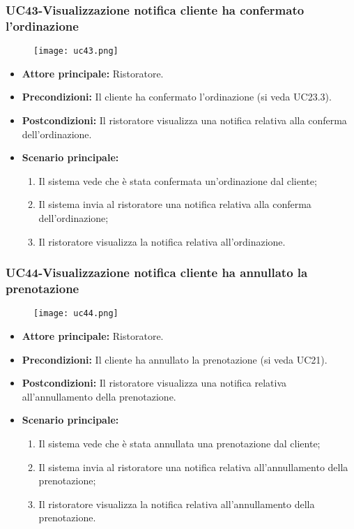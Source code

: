 \subsubsection{UC43-Visualizzazione notifica cliente ha confermato l'ordinazione}
\begin{figure}[h] \texttt{[image: uc43.png]} \end{figure}
\begin{itemize}
\item \textbf{Attore principale:} Ristoratore.
\item \textbf{Precondizioni:} Il cliente ha confermato l'ordinazione (si veda UC23.3).
\item \textbf{Postcondizioni:} Il ristoratore visualizza una notifica relativa alla conferma dell'ordinazione.
\item \textbf{Scenario principale:}
\begin{enumerate}
    \item Il sistema vede che è stata confermata un'ordinazione dal cliente;
    \item Il sistema invia al ristoratore una notifica relativa alla conferma dell'ordinazione;
    \item Il ristoratore visualizza la notifica relativa all'ordinazione.
\end{enumerate}
\end{itemize}

\subsubsection{UC44-Visualizzazione notifica cliente ha annullato la prenotazione}
\begin{figure}[h] \texttt{[image: uc44.png]} \end{figure}
\begin{itemize}
\item \textbf{Attore principale:} Ristoratore.
\item \textbf{Precondizioni:} Il cliente ha annullato la prenotazione (si veda UC21).
\item \textbf{Postcondizioni:} Il ristoratore visualizza una notifica relativa all'annullamento della prenotazione.
\item \textbf{Scenario principale:}
\begin{enumerate}
    \item Il sistema vede che è stata annullata una prenotazione dal cliente;
    \item Il sistema invia al ristoratore una notifica relativa all'annullamento della prenotazione;
    \item Il ristoratore visualizza la notifica relativa all'annullamento della prenotazione.
\end{enumerate}
\end{itemize}

